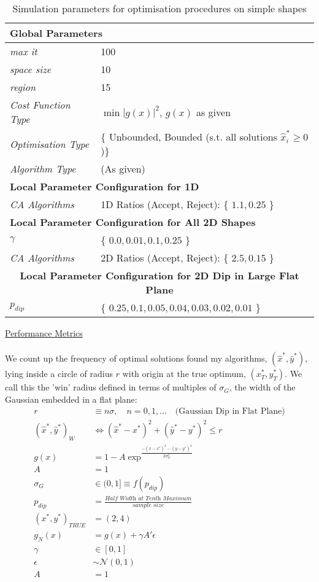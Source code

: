 \begin{table}[h]
	\centering
	\begin{tabular}{ll} 
		\hline
		\multicolumn{2}{l}{\textbf{Global Parameters}} \\
		\hline
		\textit{max it }& 100 \\
		\textit{space size }& 10 \\
		\textit{region }& 15  \\
		\textit{Cost Function Type}& $\min |g(x)|^2$, $g(x)$ as given  \\
		\textit{Optimisation Type}& \{ Unbounded, Bounded (s.t. all solutions $\hat{x}_i^* \geq 0$)\} \\
		\textit{Algorithm Type}& (As given)  \\
		\hline
		\multicolumn{2}{l}{\textbf{Local Parameter Configuration for 1D}} \\
		\hline
		\textit{CA Algorithms} & 1D Ratios (Accept, Reject): \{ $1.1, 0.25$ \} \\
		\hline
		\multicolumn{2}{l}{\textbf{Local Parameter Configuration for All 2D Shapes}} \\
		\hline
		$\gamma$ & \{ $0.0, 0.01, 0.1, 0.25$ \} \\
		\textit{CA Algorithms} & 2D Ratios (Accept, Reject): \{ $2.5, 0.15$ \} \\
		\hline
		\multicolumn{2}{c}{\textbf{Local Parameter Configuration for 2D Dip in Large Flat Plane}} \\
		\hline
		$p_{dip}$ & \{ $0.25, 0.1, 0.05, 0.04, 0.03, 0.02, 0.01$ \} \\
		\hline
	\end{tabular}
	\caption[Optimisation Routines: Summary of Simulation Paramaters for 1D and 2D Shapes]{Simulation parameters for optimisation procedures on simple shapes}
	\label{tab:optimisation_params_shape}
\end{table}
\underline{Performance Metrics}
\\
\\
We count up the frequency of optimal solutions found my algorithms, $(\hat{x}^*, \hat{y}^*)$, lying inside a circle of radius $r$ with origin at the true optimum, $(x_T^*,y_T^*)$. We call this the 'win' radius defined in terms of multiples of $\sigma_G$, the width of the Gaussian embedded in a flat plane:
\begin{align}
r & \equiv n \sigma, \quad n = 0,1,... \quad \text{(Gaussian Dip in Flat Plane)} \\
(\hat{x}^*, \hat{y}^*)_W &\iff (\hat{x}^* - x^*)^2 + (\hat{y}^* - y^*)^2 \leq r \\
g(x) & = 1 - A\exp^{\frac{-(x - x^*)^2 -(y - y^*)^2}{2\sigma_G^2}} \\ A &= 1 \\ \sigma_G & \in (0,1] \equiv f(p_{dip}) \\
p_{dip} & = \frac{\textit{Half Width at Tenth Maximum}}{\textit{sample size}} \\
(x^*, y^*)_{TRUE} &= (2,4) \\
g_N(x) &= g(x) + \gamma A' \epsilon \\ \gamma &\in [0,1] \\\epsilon & \sim \mathcal{N}(0,1) \\ 
A &= 1
\end{align}
